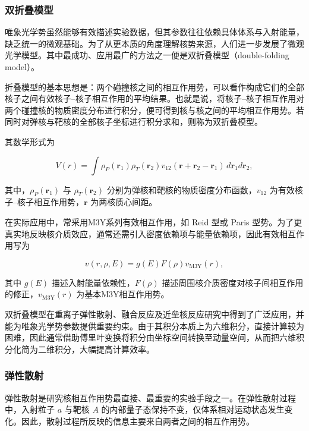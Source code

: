 \subsubsection{双折叠模型}

唯象光学势虽然能够有效描述实验数据，但其参数往往依赖具体体系与入射能量，缺乏统一的微观基础。为了从更本质的角度理解核势来源，人们进一步发展了微观光学模型。其中最成功、应用最广的方法之一便是双折叠模型（double-folding model）。

折叠模型的基本思想是：两个碰撞核之间的相互作用势，可以看作构成它们的全部核子之间有效核子--核子相互作用的平均结果。也就是说，将核子--核子相互作用对两个碰撞核的物质密度分布进行积分，便可得到核与核之间的平均相互作用势。若同时对弹核与靶核的全部核子坐标进行积分求和，则称为双折叠模型。

其数学形式为

\begin{equation}
V(r)=\int \rho_P(\mathbf{r}_1)\rho_T(\mathbf{r}_2)
v_{12}(\mathbf{r}+\mathbf{r}_2-\mathbf{r}_1)\,
d\mathbf{r}_1 d\mathbf{r}_2,
\end{equation}

其中，$\rho_P(\mathbf{r}_1)$ 与 $\rho_T(\mathbf{r}_2)$ 分别为弹核和靶核的物质密度分布函数，$v_{12}$ 为有效核子--核子相互作用势，$\mathbf{r}$ 为两核质心间距。

在实际应用中，常采用M3Y系列有效相互作用，如 Reid 型或 Paris 型势。为了更真实地反映核介质效应，通常还需引入密度依赖项与能量依赖项，因此有效相互作用写为

\begin{equation}
v(r,\rho,E)=g(E)F(\rho)v_{\mathrm{M3Y}}(r),
\end{equation}

其中 $g(E)$ 描述入射能量依赖性，$F(\rho)$ 描述周围核介质密度对核子间相互作用的修正，$v_{\mathrm{M3Y}}(r)$ 为基本M3Y相互作用势。

双折叠模型在重离子弹性散射、融合反应及近垒核反应研究中得到了广泛应用，并能为唯象光学势参数提供重要约束。由于其积分本质上为六维积分，直接计算较为困难，因此通常借助傅里叶变换将积分由坐标空间转换至动量空间，从而把六维积分化简为二维积分，大幅提高计算效率。

\subsubsection{弹性散射}

弹性散射是研究核相互作用势最直接、最重要的实验手段之一。在弹性散射过程中，入射粒子 $a$ 与靶核 $A$ 的内部量子态保持不变，仅体系相对运动状态发生变化。因此，散射过程所反映的信息主要来自两者之间的相互作用势。

